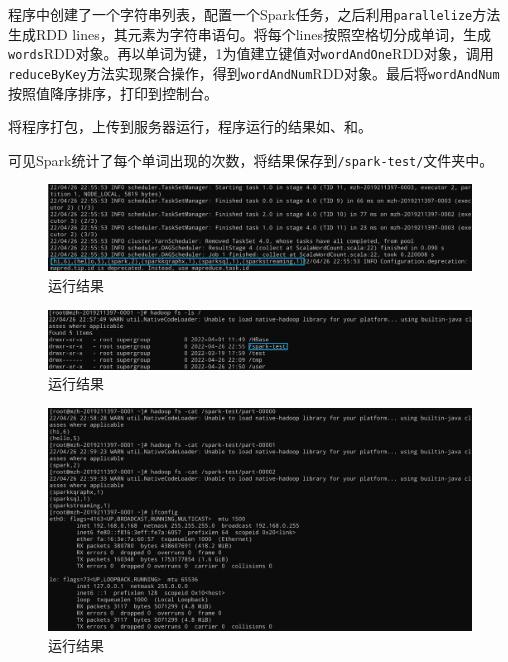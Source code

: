 \documentclass[lang=cn,11pt,a4paper,cite=authornum]{paper}
\begin{document}
程序中创建了一个字符串列表，配置一个Spark任务，之后利用\texttt{parallelize}方法生成RDD lines，其元素为字符串语句。将每个lines按照空格切分成单词，生成\texttt{words}RDD对象。再以单词为键，1为值建立键值对\texttt{wordAndOne}RDD对象，调用\texttt{reduceByKey}方法实现聚合操作，得到\texttt{wordAndNum}RDD对象。最后将\texttt{wordAndNum}按照值降序排序，打印到控制台。

将程序打包，上传到服务器运行，程序运行的结果如、和。

可见Spark统计了每个单词出现的次数，将结果保存到\texttt{/spark-test/}文件夹中。

\begin{figure}[!htb]
    \centering
    \includegraphics[width=\textwidth]{./images/res1.jpg}
    \caption{运行结果\label{fig:res1}}
\end{figure}

\begin{figure}[!htb]
    \centering
    \includegraphics[width=\textwidth]{./images/res2.jpg}
    \caption{运行结果\label{fig:res2}}
\end{figure}

\begin{figure}[!htb]
    \centering
    \includegraphics[width=\textwidth]{./images/res3.jpg}
    \caption{运行结果\label{fig:res3}}
\end{figure}
\end{document}
